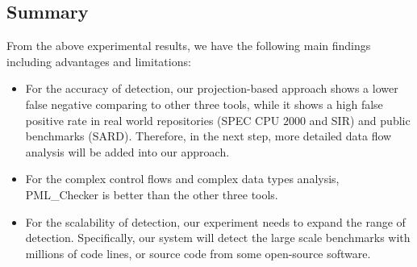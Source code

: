 \subsection{Summary}
From the above experimental results, we have the following main findings including advantages and limitations: 
\begin{itemize}
\item 
For the accuracy of detection, our projection-based approach shows a lower false negative comparing to other three tools, while it shows a high false positive rate in real world repositories (SPEC CPU $2000$ and SIR) and public benchmarks (SARD). Therefore, in the next step, more detailed data flow analysis will be added into our approach.
\item 
For the complex control flows and complex data types analysis, PML\_Checker is better than the other three tools.
\item 
For the scalability of detection, our experiment needs to expand the range of detection. Specifically, our system will detect the large scale benchmarks with millions of code lines, or source code from some open-source software.
\end{itemize}

